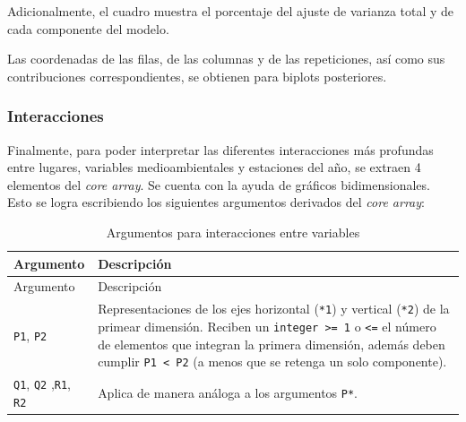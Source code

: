 \documentclass[
  spanish,
]{article}
\begin{document}
Adicionalmente, el cuadro muestra el porcentaje del ajuste de varianza total y de cada componente del modelo.

Las coordenadas de las filas, de las columnas y de las repeticiones, así como sus contribuciones correspondientes, se obtienen para biplots posteriores.

\hypertarget{interacciones}{%
\subsubsection{Interacciones}\label{interacciones}}

Finalmente, para poder interpretar las diferentes interacciones más profundas entre lugares, variables medioambientales y estaciones del año, se extraen 4 elementos del \emph{core array}. Se cuenta con la ayuda de gráficos bidimensionales. Esto se logra escribiendo los siguientes argumentos derivados del \emph{core array}:

\begin{longtable}[]{@{}ll@{}}
\caption{Argumentos para interacciones entre variables}\tabularnewline
\toprule
\begin{minipage}[b]{0.16\columnwidth}\raggedright
Argumento\strut
\end{minipage} & \begin{minipage}[b]{0.72\columnwidth}\raggedright
Descripción\strut
\end{minipage}\tabularnewline
\midrule
\endfirsthead
\toprule
\begin{minipage}[b]{0.16\columnwidth}\raggedright
Argumento\strut
\end{minipage} & \begin{minipage}[b]{0.72\columnwidth}\raggedright
Descripción\strut
\end{minipage}\tabularnewline
\midrule
\endhead
\begin{minipage}[t]{0.16\columnwidth}\raggedright
\texttt{P1}, \texttt{P2}\strut
\end{minipage} & \begin{minipage}[t]{0.72\columnwidth}\raggedright
Representaciones de los ejes horizontal (\texttt{*1}) y
vertical (\texttt{*2}) de la primear dimensión. Reciben un
\texttt{integer\ \textgreater{}=\ 1} o \texttt{\textless{}=} el número de elementos que
integran la primera dimensión, además deben cumplir
\texttt{P1\ \textless{}\ P2} (a menos que se retenga un solo componente).\strut
\end{minipage}\tabularnewline
\begin{minipage}[t]{0.16\columnwidth}\raggedright
\texttt{Q1}, \texttt{Q2}
,\texttt{R1},
\texttt{R2}\strut
\end{minipage} & \begin{minipage}[t]{0.72\columnwidth}\raggedright
Aplica de manera análoga a los argumentos \texttt{P*}.\strut
\end{minipage}\tabularnewline
\bottomrule
\end{longtable}
\end{document}
